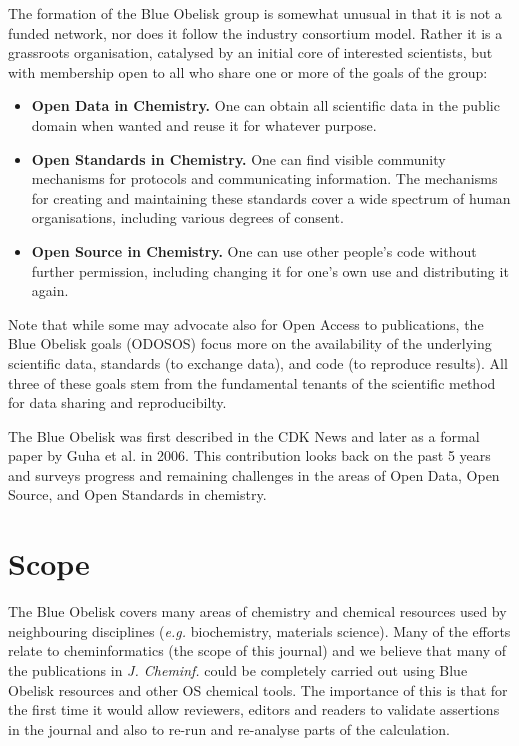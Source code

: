 \documentclass[10pt]{bmc_article}
\newenvironment{bmcformat}{\fussy\setboolean{publ}{true}}{\fussy}
\begin{document}
\begin{bmcformat}
The formation of the Blue Obelisk group is somewhat unusual in that it
is not a funded network, nor does it follow the industry consortium
model. Rather it is a grassroots organisation, catalysed by an initial
core of interested scientists, but with membership open to all who
share one or more of the goals of the group:
\begin{itemize}
\item {\bf Open Data in Chemistry.} One can obtain all scientific data in the public domain when
wanted and reuse it for whatever purpose.
\item {\bf Open Standards in Chemistry.} One can find visible community mechanisms for
protocols and communicating information. The mechanisms for creating
and maintaining these standards cover a wide spectrum of human
organisations, including various degrees of consent.
\item {\bf Open Source in Chemistry.} One can use other people's code without further
permission, including changing it for one's own use and distributing
it again.
\end{itemize}

Note that while some may advocate also for Open Access to
publications, the Blue Obelisk goals (ODOSOS) focus more on the
availability of the underlying scientific data, standards (to exchange
data), and code (to reproduce results). All three of these goals stem
from the fundamental tenants of the scientific method for data sharing
and reproducibilty.

The Blue Obelisk was first described in the CDK News \cite{CDKNewsBO} and
later as a formal paper by Guha et al.\cite{Guha2006} in
2006. This contribution looks back on the past 5 years and surveys
progress and remaining challenges in the areas of Open Data, Open
Source, and Open Standards in chemistry.


\section*{Scope}
The Blue Obelisk covers many areas of chemistry and chemical resources
used by neighbouring disciplines ({\it e.g.} biochemistry, materials
science). Many of the efforts relate to cheminformatics (the scope of
this journal) and we believe that many of the publications in {\it J.
Cheminf.} could be completely carried out using Blue Obelisk resources
and other OS chemical tools. The importance of this is that for the
first time it would allow reviewers, editors and readers to validate
assertions in the journal and also to re-run and re-analyse parts of
the calculation.


\end{bmcformat}
\end{document}
